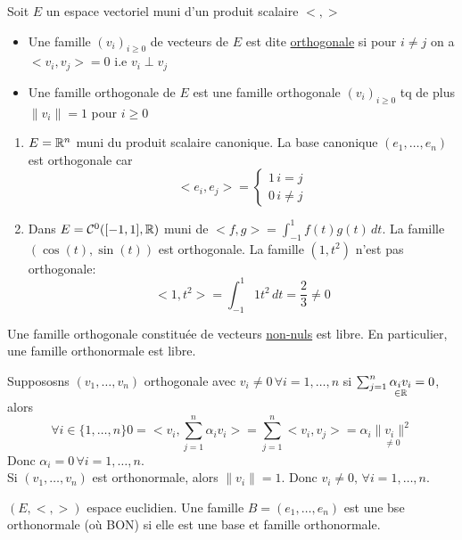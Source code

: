 \begin{definition}
    Soit $E$ un espace vectoriel muni d'un produit scalaire  $<,>$
     \begin{itemize}
         \item Une famille $(v_i)_{i \ge 0}$ de vecteurs de $E$ est dite \underline{orthogonale} si pour $i \neq j$ on a $<v_i, v_j> = 0$ i.e  $v_i \perp v_j$
         \item Une famille orthogonale de  $E$ est une famille orthogonale  $(v_i)_{i \ge  0}$ tq de plus $\|v_i\| = 1$ pour  $i \ge 0$
    \end{itemize}
\end{definition}
\begin{eg}
   \begin{enumerate}
       \item $E = \mathbb{R}^{n}$ muni du produit scalaire canonique. La base canonique $(e_1, \ldots, e_n)$ est orthogonale car 
           \[
           <e_i, e_j> = \begin{cases}
               1 \, i = j\\
               0 \, i \neq j
           \end{cases}
           \] 
       \item Dans $E = \mathcal{C}^{0}([-1, 1], \mathbb{R})$ muni de $<f,g> = \int_{-1}^{1} f(t)g(t)\,d{t}$. La famille $(\cos(t), \sin(t))$ est orthogonale. La famille $(1, t^2)$ n'est pas orthogonale:
            \[
                <1, t^2> = \int_{-1}^{1} 1 t^2 \, d{t} = \frac{2}{3} \neq  0 
           \] 
   \end{enumerate} 
\end{eg}
\begin{prop}
    Une famille orthogonale constituée de vecteurs \underline{non-nuls} est libre. En particulier, une famille orthonormale est libre. 
\end{prop}
\begin{preuve}
    Suppososns $(v_1, \ldots, v_n)$ orthogonale avec $v_i \neq 0 \, \forall i = 1, \ldots, n$ si $\sum_{j=1}^{n} \underset{\in \mathbb{R}}{\alpha_iv_i} = 0$, alors  
    \[
        \forall i \in \{1, \ldots, n\} 0 = <v_i, \sum_{j=1}^{n} \alpha_iv_i> = \sum_{j=1}^{n} <v_i, v_j> = \alpha_i \underset{\neq 0}{\|v_i\|^2}
    \] 
    Donc $\alpha_i = 0 \, \forall i = 1, \ldots, n$.\\
    Si $(v_1, \ldots, v_n)$ est orthonormale, alors $\|v_i\| = 1$. Donc  $v_i \neq 0, \, \forall i = 1, \ldots, n$.
\end{preuve}
\begin{definition}
    $(E, <,>)$ espace euclidien. Une famille  $B = (e_1, \ldots, e_n)$ est une bse orthonormale (où BON) si elle est une base et famille orthonormale.
\end{definition}

